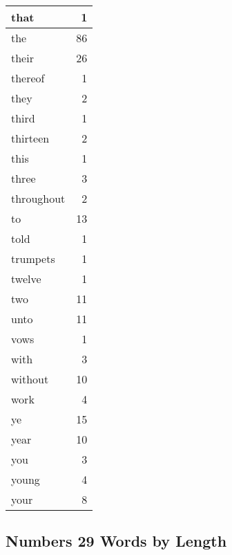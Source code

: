 \begin{center}
\begin{longtable}{l|r}
that & 1\\ \hline 
the & 86\\ \hline 
their & 26\\ \hline 
thereof & 1\\ \hline 
they & 2\\ \hline 
third & 1\\ \hline 
thirteen & 2\\ \hline 
this & 1\\ \hline 
three & 3\\ \hline 
throughout & 2\\ \hline 
to & 13\\ \hline 
told & 1\\ \hline 
trumpets & 1\\ \hline 
twelve & 1\\ \hline 
two & 11\\ \hline 
unto & 11\\ \hline 
vows & 1\\ \hline 
with & 3\\ \hline 
without & 10\\ \hline 
work & 4\\ \hline 
ye & 15\\ \hline 
year & 10\\ \hline 
you & 3\\ \hline 
young & 4\\ \hline 
your & 8\\ \hline 
\end{longtable}
\end{center}





\subsection{Numbers 29 Words by Length}


\normalsize
 
